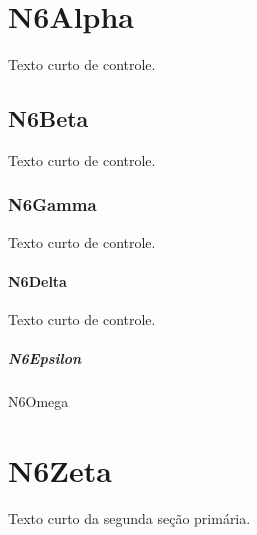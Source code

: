 \documentclass{abntexto-ufc}
\begin{document}
\textual

\section{N6Alpha}
Texto curto de controle.

\subsection{N6Beta}
Texto curto de controle.

\subsubsection{N6Gamma}
Texto curto de controle.

\paragraph{N6Delta}
Texto curto de controle.

\subparagraph{N6Epsilon}
N6Omega

\section{N6Zeta}
Texto curto da segunda seção primária.
\end{document}
